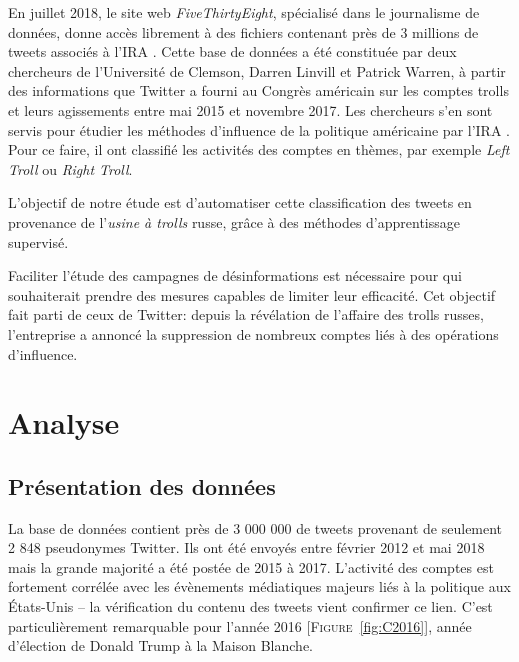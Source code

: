 \documentclass[twocolumn,10pt]{article}
\begin{document}
En juillet 2018, le site web \textit{FiveThirtyEight}, spécialisé dans le journalisme de données, donne accès librement à des fichiers contenant près de 3 millions de tweets associés à l'IRA \cite{OR18}. Cette base de données a été constituée par deux chercheurs de l'Université de Clemson, Darren Linvill et Patrick Warren, à partir des informations que Twitter a fourni au Congrès américain sur les comptes trolls et leurs agissements entre mai 2015 et novembre 2017. Les chercheurs s'en sont servis pour étudier les méthodes d'influence de la politique américaine par l'IRA \cite{DLPW18}. Pour ce faire, il ont classifié les activités des comptes en thèmes, par exemple \textit{Left Troll} ou \textit{Right Troll}.

L'objectif de notre étude est d'automatiser cette classification des tweets en provenance de l'\textit{usine à trolls} russe, grâce à des méthodes d'apprentissage supervisé.

Faciliter l'étude des campagnes de désinformations est nécessaire pour qui souhaiterait prendre des mesures capables de limiter leur efficacité. Cet objectif fait parti de ceux de Twitter: depuis la révélation de l'affaire des trolls russes, l'entreprise a annoncé la suppression de nombreux comptes liés à des opérations d'influence.


\section{Analyse}\label{sec:contenu}


\subsection{Présentation des données}

La base de données contient près de 3 000 000 de tweets provenant de seulement 2 848 pseudonymes Twitter. Ils ont été envoyés entre février 2012 et mai 2018 mais la grande majorité a été postée de 2015 à 2017. L'activité des comptes est fortement corrélée avec les évènements médiatiques majeurs liés à la politique aux États-Unis -- la vérification du contenu des tweets vient confirmer ce lien. C'est particulièrement remarquable pour l'année 2016 [\textsc{Figure}~\ref{fig:C2016}], année d'élection de Donald Trump à la Maison Blanche.
\end{document}
